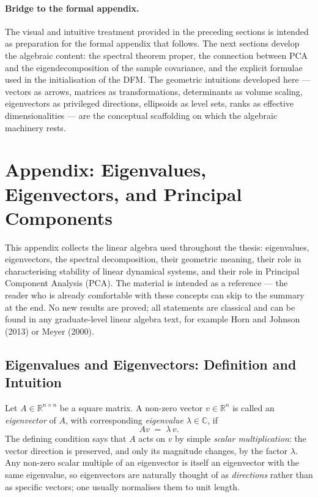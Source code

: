 \documentclass[11pt, a4paper, oneside]{article}
\begin{document}
\paragraph{Bridge to the formal appendix.}
The visual and intuitive treatment provided in the preceding sections
is intended as preparation for the formal appendix that
follows. The next sections develop the algebraic content: the
spectral theorem proper, the connection between PCA and the
eigendecomposition of the sample covariance, and the explicit
formulae used in the initialisation of the DFM. The geometric
intuitions developed here — vectors as arrows, matrices as
transformations, determinants as volume scaling, eigenvectors as
privileged directions, ellipsoids as level sets, ranks as effective
dimensionalities — are the conceptual scaffolding on which the
algebraic machinery rests.

\newpage
\section{Appendix: Eigenvalues, Eigenvectors, and Principal Components}
\label{sec:appendix-eigen}

This appendix collects the linear algebra used throughout the thesis:
eigenvalues, eigenvectors, the spectral decomposition, their geometric
meaning, their role in characterising stability of linear dynamical
systems, and their role in Principal Component Analysis (PCA). The
material is intended as a reference — the reader who is already
comfortable with these concepts can skip to the summary at the end.
No new results are proved; all statements are classical and can be
found in any graduate-level linear algebra text, for example Horn and
Johnson (2013) or Meyer (2000).

\subsection{Eigenvalues and Eigenvectors: Definition and Intuition}

Let $A \in \mathbb{R}^{n \times n}$ be a square matrix. A non-zero
vector $v \in \mathbb{R}^n$ is called an \emph{eigenvector} of $A$,
with corresponding \emph{eigenvalue} $\lambda \in \mathbb{C}$, if
\begin{equation}
A v \;=\; \lambda\, v.
\label{eq:eigen-definition}
\end{equation}
The defining condition says that $A$ acts on $v$ by simple
\emph{scalar multiplication}: the vector direction is preserved, and
only its magnitude changes, by the factor $\lambda$. Any non-zero
scalar multiple of an eigenvector is itself an eigenvector with the
same eigenvalue, so eigenvectors are naturally thought of as
\emph{directions} rather than as specific vectors; one usually
normalises them to unit length.
\end{document}
